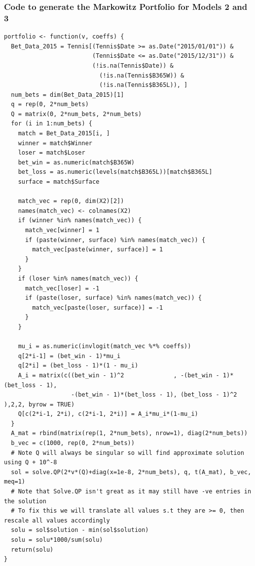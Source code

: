 \documentclass[11pt]{article} %
\begin{document}
\subsubsection*{Code to generate the Markowitz Portfolio for Models 2 and 3}
\begin{lstlisting}
portfolio <- function(v, coeffs) {
  Bet_Data_2015 = Tennis[(Tennis$Date >= as.Date("2015/01/01")) &
                         (Tennis$Date <= as.Date("2015/12/31")) & 
                         (!is.na(Tennis$Date)) & 
                           (!is.na(Tennis$B365W)) & 
                           (!is.na(Tennis$B365L)), ]
  num_bets = dim(Bet_Data_2015)[1]
  q = rep(0, 2*num_bets)
  Q = matrix(0, 2*num_bets, 2*num_bets)
  for (i in 1:num_bets) {
    match = Bet_Data_2015[i, ]
    winner = match$Winner
    loser = match$Loser
    bet_win = as.numeric(match$B365W)
    bet_loss = as.numeric(levels(match$B365L))[match$B365L]
    surface = match$Surface
    
    match_vec = rep(0, dim(X2)[2])
    names(match_vec) <- colnames(X2)
    if (winner %in% names(match_vec)) {
      match_vec[winner] = 1
      if (paste(winner, surface) %in% names(match_vec)) {
        match_vec[paste(winner, surface)] = 1
      }
    }
    if (loser %in% names(match_vec)) {
      match_vec[loser] = -1
      if (paste(loser, surface) %in% names(match_vec)) {
        match_vec[paste(loser, surface)] = -1
      }
    }
    
    mu_i = as.numeric(invlogit(match_vec %*% coeffs))
    q[2*i-1] = (bet_win - 1)*mu_i
    q[2*i] = (bet_loss - 1)*(1 - mu_i)
    A_i = matrix(c((bet_win - 1)^2              , -(bet_win - 1)*(bet_loss - 1),
                   -(bet_win - 1)*(bet_loss - 1), (bet_loss - 1)^2             ),2,2, byrow = TRUE)
    Q[c(2*i-1, 2*i), c(2*i-1, 2*i)] = A_i*mu_i*(1-mu_i)
  }
  A_mat = rbind(matrix(rep(1, 2*num_bets), nrow=1), diag(2*num_bets))
  b_vec = c(1000, rep(0, 2*num_bets))
  # Note Q will always be singular so will find approximate solution using Q + 10^-8
  sol = solve.QP(2*v*(Q)+diag(x=1e-8, 2*num_bets), q, t(A_mat), b_vec, meq=1)
  # Note that Solve.QP isn't great as it may still have -ve entries in the solution
  # To fix this we will translate all values s.t they are >= 0, then rescale all values accordingly
  solu = sol$solution - min(sol$solution)
  solu = solu*1000/sum(solu)
  return(solu)
}
\end{lstlisting}
\end{document}

